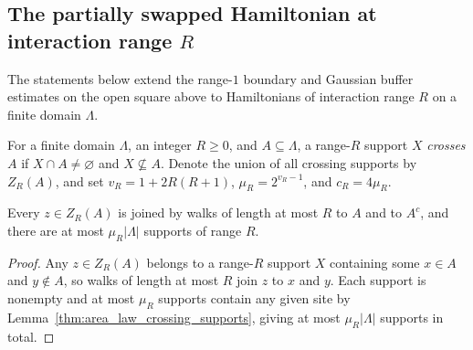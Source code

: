 \subsection{The partially swapped Hamiltonian at interaction range $R$}

The statements below extend the range-$1$ boundary and Gaussian buffer
estimates on the open square above to Hamiltonians of interaction range $R$
on a finite domain $\Lambda$.

\begin{definition}
    \label{def:peps_crossing_supports}
    \leanok
    For a finite domain $\Lambda$, an integer $R\ge0$, and $A\subseteq\Lambda$,
    a range-$R$ support $X$ \emph{crosses} $A$ if $X\cap A\ne\varnothing$ and
    $X\not\subseteq A$. Denote the union of all crossing supports by $Z_R(A)$,
    and set $v_R=1+2R(R+1)$, $\mu_R=2^{v_R-1}$, and $c_R=4\mu_R$.
\end{definition}

\begin{lemma}
    \label{lem:peps_crossing_supports_near_and_few}
    \leanok
    Every $z\in Z_R(A)$ is joined by walks of length at most $R$ to $A$ and to
    $A^c$, and there are at most $\mu_R|\Lambda|$ supports of range $R$.
\end{lemma}
\begin{proof}
    \leanok
    Any $z\in Z_R(A)$ belongs to a range-$R$ support $X$ containing some
    $x\in A$ and $y\notin A$, so walks of length at most $R$ join $z$ to $x$
    and $y$. Each support is nonempty and at most $\mu_R$ supports contain any
    given site by Lemma~\ref{thm:area_law_crossing_supports}, giving at most
    $\mu_R|\Lambda|$ supports in total.
\end{proof}

